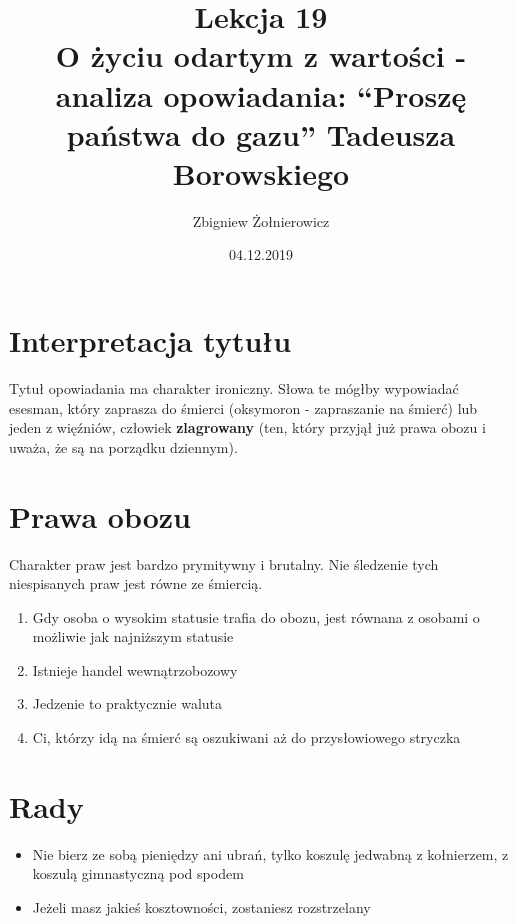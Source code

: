 \documentclass[a4paper]{article}
\begin{document}
\title{{\huge Lekcja 19} \\
{\large O życiu odartym z wartości - analiza opowiadania: ``Proszę państwa do gazu'' Tadeusza Borowskiego}}
\author{Zbigniew Żołnierowicz}
\date{04.12.2019}
\maketitle
\section{Interpretacja tytułu}
Tytuł opowiadania ma charakter ironiczny. Słowa te mógłby wypowiadać esesman, który zaprasza do śmierci (oksymoron - zapraszanie na śmierć) lub jeden z więźniów, człowiek \textbf{zlagrowany} (ten, który przyjął już prawa obozu i uważa, że są na porządku dziennym).
\section{Prawa obozu}
Charakter praw jest bardzo prymitywny i brutalny. Nie śledzenie tych niespi\-sanych praw jest równe ze śmiercią.
\begin{enumerate}
    \item Gdy osoba o wysokim statusie trafia do obozu, jest równana z osobami o możliwie jak najniższym statusie
    \item Istnieje handel wewnątrzobozowy
    \item Jedzenie to praktycznie waluta
    \item Ci, którzy idą na śmierć są oszukiwani aż do przysłowiowego stryczka
\end{enumerate}
\section{Rady}
\begin{itemize}
    \item Nie bierz ze sobą pieniędzy ani ubrań, tylko koszulę jedwabną z kołnierzem, z koszulą gimnastyczną pod spodem
    \item Jeżeli masz jakieś kosztowności, zostaniesz rozstrzelany
\end{itemize}
\end{document}
